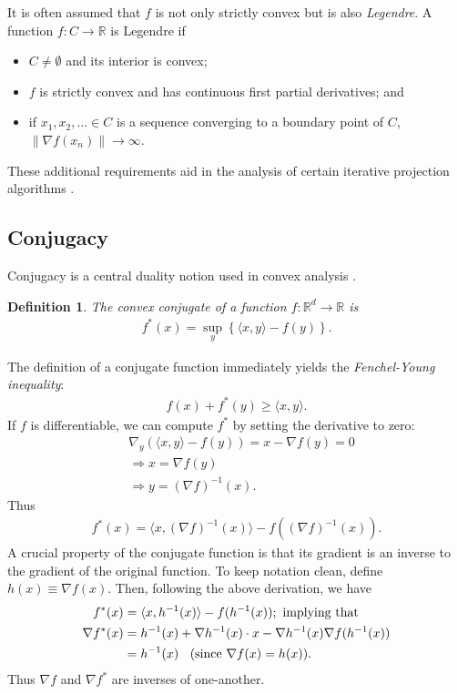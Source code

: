 \documentclass{article}
\newtheorem{define}{Definition}
\newcommand{\R}{\mathbb{R}}
\begin{document}
It is often assumed that $f$ is not only strictly convex but is also
\emph{Legendre}.  A function $f:C\rightarrow \R$ is Legendre if 
\begin{itemize}
\item $C \neq \emptyset$ and its interior is convex;
\item $f$ is strictly convex and has continuous first partial
  derivatives; and
\item if $x_1,x_2,\ldots \in C$ is a sequence converging to a boundary
  point of $C$, $\|\nabla f(x_n) \| \rightarrow \infty$.
\end{itemize}
These additional requirements aid in the analysis of certain iterative
projection algorithms \cite{cz.97}.  

\subsection{Conjugacy} \label{sec:conjugate}
Conjugacy is a central duality notion used in convex analysis \cite{r.70}.
\begin{define}
The \emph{convex conjugate} of a function $f: \R^d\rightarrow \R$ is
\begin{align*}
f^*(x) = \sup_y \left\{\langle x,y \rangle - f(y) \right\}.
\end{align*}
\end{define}
The definition of a conjugate function immediately yields the 
\emph{Fenchel-Young inequality}:
\begin{align*}
f(x) + f^*(y) \geq \langle x,y \rangle.
\end{align*}
If $f$ is differentiable, we can compute $f^*$ by setting the
derivative to zero:
\begin{align*}
&\nabla_y \left( \langle x,y \rangle - f(y) \right)  = x - \nabla f(y)
= 0\\
&\Longrightarrow x = \nabla f(y)\\
&\Longrightarrow y = (\nabla f)^{-1}(x).
\end{align*}
Thus
\begin{align}
f^*(x) = \langle x, (\nabla f)^{-1}(x) \rangle - f( (\nabla
f)^{-1}(x)). \label{eq:conjdef}
\end{align}
A crucial property of the conjugate function is that its gradient
is an inverse to the gradient of the original function.  To keep
notation clean, define $h(x) \equiv \nabla f(x)$.  Then, following the
above derivation, we have
\begin{align*}
f^*(x) &= \langle x,h^{-1}(x) \rangle - f(h^{-1}(x)); \mbox{ implying
  that }\\
\nabla f^*(x) &= h^{-1}(x) + \nabla h^{-1}(x) \cdot x - \nabla
h^{-1}(x) \nabla f(h^{-1}(x))\\
&=h^{-1}(x)\mbox{\;\; (since }\nabla f(x) = h(x)).  
\end{align*}
Thus $\nabla f$ and $\nabla f^*$ are inverses of one-another.  
\end{document}
